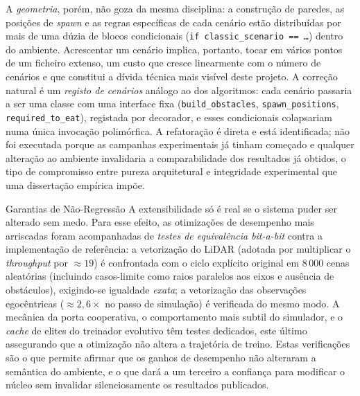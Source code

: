 \documentclass[12pt,reqno, twoside]{amsbook}
\makeatletter
\def\subsection{\@startsection{subsection}{2}%
      \z@{.5\linespacing\@plus.7\linespacing}{.25\linespacing}%
      {\normalfont\bfseries\flushleft}}
\theoremstyle{plain}
\numberwithin{equation}{chapter}
\numberwithin{section}{chapter}
\numberwithin{table}{chapter}
\numberwithin{figure}{chapter}
\makeatother
\begin{document}
A \emph{geometria}, porém, não goza da mesma disciplina: a construção de paredes, as posições de \textit{spawn} e as regras específicas de cada cenário estão distribuídas por mais de uma dúzia de blocos condicionais (\texttt{if classic\_scenario == \dots}) dentro do ambiente. Acrescentar um cenário implica, portanto, tocar em vários pontos de um ficheiro extenso, um custo que cresce linearmente com o número de cenários e que constitui a dívida técnica mais visível deste projeto. A correção natural é um \emph{registo de cenários} análogo ao dos algoritmos: cada cenário passaria a ser uma classe com uma interface fixa (\texttt{build\_obstacles}, \texttt{spawn\_positions}, \texttt{required\_to\_eat}), registada por decorador, e esses condicionais colapsariam numa única invocação polimórfica. A refatoração é direta e está identificada; não foi executada porque as campanhas experimentais já tinham começado e qualquer alteração ao ambiente invalidaria a comparabilidade dos resultados já obtidos, o tipo de compromisso entre pureza arquitetural e integridade experimental que uma dissertação empírica impõe.

\subsection{Garantias de Não-Regressão}
A extensibilidade só é real se o sistema puder ser alterado sem medo. Para esse efeito, as otimizações de desempenho mais arriscadas foram acompanhadas de \emph{testes de equivalência bit-a-bit} contra a implementação de referência: a vetorização do LiDAR (adotada por multiplicar o \textit{throughput} por $\approx 19$) é confrontada com o ciclo explícito original em $8\,000$ cenas aleatórias (incluindo casos-limite como raios paralelos aos eixos e ausência de obstáculos), exigindo-se igualdade \emph{exata}; a vetorização das observações egocêntricas ($\approx 2{,}6\times$ no passo de simulação) é verificada do mesmo modo. A mecânica da porta cooperativa, o comportamento mais subtil do simulador, e o \textit{cache} de elites do treinador evolutivo têm testes dedicados, este último assegurando que a otimização não altera a trajetória de treino. Estas verificações são o que permite afirmar que os ganhos de desempenho não alteraram a semântica do ambiente, e o que dará a um terceiro a confiança para modificar o núcleo sem invalidar silenciosamente os resultados publicados.
\end{document}
